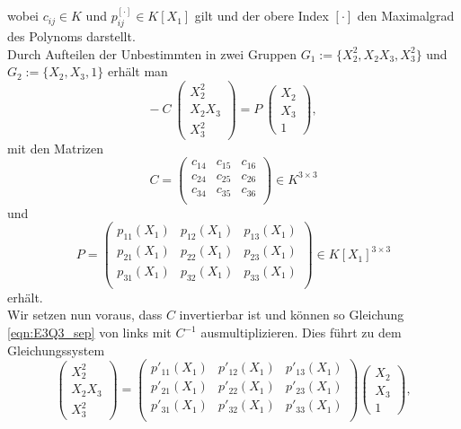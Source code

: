 \documentclass[a4paper,oneside, 11pt, openany%
]{article}
\newcommand{\coloneqq}{:=}
\theoremstyle{custom}
\theoremstyle{custom}
\begin{document}
	wobei $c_{ij} \in K$ und $p_{ij}^{\left[\cdot \right] } \in K\left[ X_{1}\right]$ gilt und der obere Index $\left[\cdot \right]$ den Maximalgrad des Polynoms darstellt.\\
	Durch Aufteilen der Unbestimmten in zwei Gruppen $G_1 \coloneqq \{X_{2}^2,X_{2}X_{3},X_{3}^2\}$ und $G_2 \coloneqq \{X_{2},X_{3},1\}$ erhält man
	\begin{equation}\label{eqn:E3Q3_sep}
		- \ 
		C \
		\begin{pmatrix}
			X_{2}^2\\X_{2}X_{3}\\X_{3}^2
		\end{pmatrix} 
		=
		P \
		\begin{pmatrix}
			X_{2}\\X_{3}\\1
		\end{pmatrix},
	\end{equation}
	mit den Matrizen
	\begin{equation}
		C = \begin{pmatrix}
			c_{14}&c_{15}&c_{16}\\
			c_{24}&c_{25}&c_{26}\\
			c_{34}&c_{35}&c_{36}\\
		\end{pmatrix} \in K^{3 \times 3}
	\end{equation}
	und
	\begin{equation}
		P = \begin{pmatrix}
			p_{11}\left(X_{1}\right)&p_{12}\left(X_{1}\right)&p_{13}\left(X_{1}\right)\\
			p_{21}\left(X_{1}\right)&p_{22}\left(X_{1}\right)&p_{23}\left(X_{1}\right)\\
			p_{31}\left(X_{1}\right)&p_{32}\left(X_{1}\right)&p_{33}\left(X_{1}\right)\\
		\end{pmatrix} \in K[X_1]^{3 \times 3}
	\end{equation}
	erhält.\\
	Wir setzen nun voraus, dass $C$ invertierbar ist und können so Gleichung \eqref{eqn:E3Q3_sep} von links mit $C^{-1}$ ausmultiplizieren. Dies führt zu dem Gleichungssystem
	\begin{equation}\label{eqn:E3Q3_inv}
			\begin{pmatrix}
			X_{2}^2\\X_{2}X_{3}\\X_{3}^2
		\end{pmatrix} 
		=
		\begin{pmatrix}
		p'_{11}\left(X_{1}\right)&p'_{12}\left(X_{1}\right)&p'_{13}\left(X_{1}\right)\\
		p'_{21}\left(X_{1}\right)&p'_{22}\left(X_{1}\right)&p'_{23}\left(X_{1}\right)\\
		p'_{31}\left(X_{1}\right)&p'_{32}\left(X_{1}\right)&p'_{33}\left(X_{1}\right)\\
		\end{pmatrix}
		\begin{pmatrix}
			X_{2}\\X_{3}\\1
		\end{pmatrix}
		,
	\end{equation}
\end{document}
